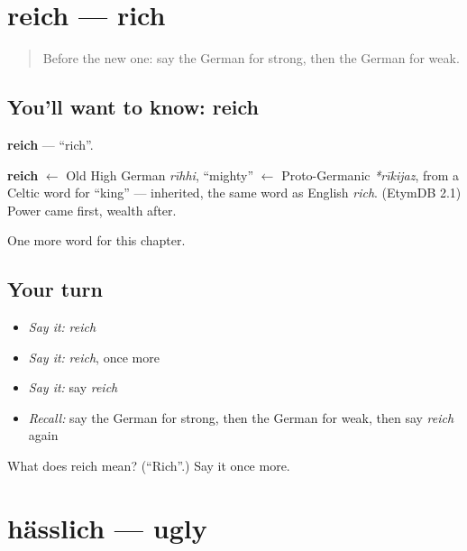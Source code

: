 \section[reich]{reich — rich}

\label{lesson:GE-C91-reich}



\begin{quote}
Before the new one: say the German for strong, then the German for weak.
\end{quote}

\subsection*{You'll want to know: reich}
\textbf{reich} — \textquotedblleft{}rich\textquotedblright{}.

\begin{cousinweb}
\textbf{reich} $\leftarrow$ Old High German \emph{rīhhi}, \textquotedblleft{}mighty\textquotedblright{} $\leftarrow$ Proto-Germanic \emph{*rīkijaz}, from a Celtic word for \textquotedblleft{}king\textquotedblright{} — inherited, the same word as English \emph{rich}. (EtymDB 2.1) Power came first, wealth after.
\end{cousinweb}

\begin{grammarlens}[title={What you've built}]
One more word for this chapter.
\end{grammarlens}

\subsection*{Your turn}
\begin{itemize}
\raggedright
  \item \emph{Say it:} \emph{reich}
  \item \emph{Say it:} \emph{reich}, once more
  \item \emph{Say it:} say \emph{reich}
  \item \emph{Recall:} say the German for strong, then the German for weak, then say \emph{reich} again
\end{itemize}

\begin{tcolorbox}[breakable,colback=teal!4,colframe=teal!35!black,title={Before you move on}]
What does reich mean? (\textquotedblleft{}Rich\textquotedblright{}.) Say it once more.
\end{tcolorbox}
\section[hässlich]{hässlich — ugly}

